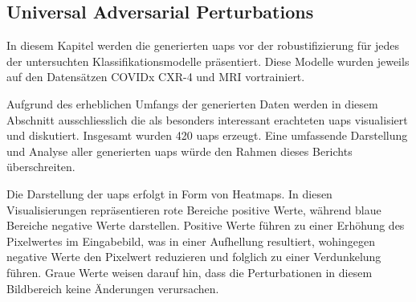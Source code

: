 \subsection{Universal Adversarial Perturbations}
In diesem Kapitel werden die generierten \acrlong{uap}s vor der \Gls{robustifizierung} für jedes der untersuchten Klassifikationsmodelle präsentiert. Diese Modelle wurden jeweils auf den Datensätzen COVIDx CXR-4 und MRI vortrainiert. 

Aufgrund des erheblichen Umfangs der generierten Daten werden in diesem Abschnitt ausschliesslich die als besonders interessant erachteten \acrshort{uap}s visualisiert und diskutiert. Insgesamt wurden 420 \acrshort{uap}s erzeugt. Eine umfassende Darstellung und Analyse aller generierten \acrshort{uap}s würde den Rahmen dieses Berichts überschreiten. 

Die Darstellung der \acrshort{uap}s erfolgt in Form von Heatmaps. In diesen Visualisierungen repräsentieren rote Bereiche positive Werte, während blaue Bereiche negative Werte darstellen. Positive Werte führen zu einer Erhöhung des Pixelwertes im Eingabebild, was in einer Aufhellung resultiert, wohingegen negative Werte den Pixelwert reduzieren und folglich zu einer Verdunkelung führen. Graue Werte weisen darauf hin, dass die Perturbationen in diesem Bildbereich keine Änderungen verursachen.

